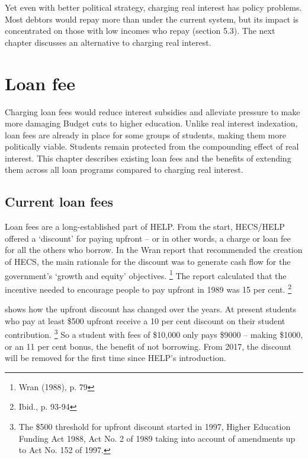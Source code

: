 \documentclass[embargoed]{grattan}
\begin{document}
Yet even with better political strategy, charging real interest has policy problems.
Most debtors would repay more than under the current system, but its impact is concentrated on those with low incomes who repay (section 5.3).
The next chapter discusses an alternative to charging real interest.

\chapter{Loan fee}\label{chap:loan-fee}

Charging loan fees would reduce interest subsidies and alleviate pressure to make more damaging Budget cuts to higher education.
Unlike real interest indexation, loan fees are already in place for some groups of students, making them more politically viable.
Students remain protected from the compounding effect of real interest.
This chapter describes existing loan fees and the benefits of extending them across all loan programs compared to charging real interest.

\section{Current loan fees}\label{sec:current-loan-fees}

Loan fees are a long-established part of \gls{HELP}.
From the start, \gls{HECS}/\gls{HELP} offered a `discount' for paying upfront -- or in other words, a charge or loan fee for all the others who borrow.
In the Wran report that recommended the creation of \gls{HECS}, the main rationale for the discount was to generate cash flow for the government's `growth and equity' objectives.%
\footnote{Wran (1988), p. 79} The report calculated that the incentive needed to encourage people to pay upfront in 1989 was 15 per cent.%
\footnote{Ibid., p. 93-94}

 shows how the upfront discount has changed over the years.
At present students who pay at least \$500 upfront receive a 10 per cent discount on their student contribution.%
\footnote{The \$500 threshold for upfront discount started in 1997, Higher Education Funding Act 1988, Act No. 2 of 1989 taking into account of amendments up to Act No. 152 of 1997.} So a student with fees of \$10,000 only pays \$9000 -- making \$1000, or an 11 per cent bonus, the benefit of not borrowing.
From 2017, the discount will be removed for the first time since \gls{HELP}'s introduction.
\end{document}
